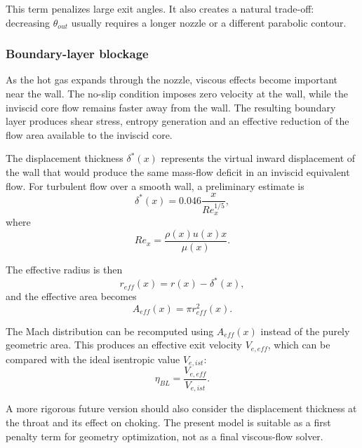 \documentclass[journal,article,submit,oneauthor]{Definitions/mdpi}
\begin{document}
This term penalizes large exit angles. It also creates a natural trade-off: decreasing $\theta_{out}$ usually requires a longer nozzle or a different parabolic contour.

\subsubsection{Boundary-layer blockage}

As the hot gas expands through the nozzle, viscous effects become important near the wall. The no-slip condition imposes zero velocity at the wall, while the inviscid core flow remains faster away from the wall. The resulting boundary layer produces shear stress, entropy generation and an effective reduction of the flow area available to the inviscid core.

The displacement thickness $\delta^*(x)$ represents the virtual inward displacement of the wall that would produce the same mass-flow deficit in an inviscid equivalent flow. For turbulent flow over a smooth wall, a preliminary estimate is
\begin{equation}
\delta^*(x)=0.046\frac{x}{Re_x^{1/5}},
\label{eq:delta_star}
\end{equation}
where
\begin{equation}
Re_x=\frac{\rho(x)u(x)x}{\mu(x)}.
\label{eq:Rex}
\end{equation}

The effective radius is then
\begin{equation}
r_{eff}(x)=r(x)-\delta^*(x),
\label{eq:reff}
\end{equation}
and the effective area becomes
\begin{equation}
A_{eff}(x)=\pi r_{eff}^2(x).
\label{eq:Aeff}
\end{equation}

The Mach distribution can be recomputed using $A_{eff}(x)$ instead of the purely geometric area. This produces an effective exit velocity $V_{e,eff}$, which can be compared with the ideal isentropic value $V_{e,ist}$:
\begin{equation}
\boxed{\eta_{BL}=\frac{V_{e,eff}}{V_{e,ist}}}.
\label{eq:eta_BL}
\end{equation}

A more rigorous future version should also consider the displacement thickness at the throat and its effect on choking. The present model is suitable as a first penalty term for geometry optimization, not as a final viscous-flow solver.
\end{document}

